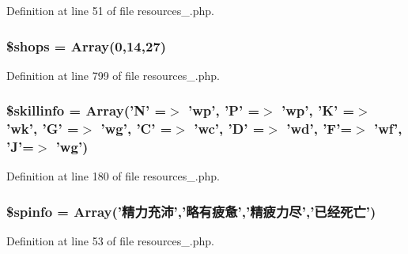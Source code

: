 Definition at line 51 of file resources\+\_.\+php.

\hypertarget{cache_2resources__1_8php_a6a4f6f4fa7edf238e168beb18f0870af}{
\subsubsection[{\$shops}]{\setlength{\rightskip}{0pt plus 5cm}\$shops = Array(0,14,27)}}\label{cache_2resources__1_8php_a6a4f6f4fa7edf238e168beb18f0870af}


Definition at line 799 of file resources\+\_.\+php.

\hypertarget{cache_2resources__1_8php_a94b9a3413b45767e103c4f7ad2346921}{
\subsubsection[{\$skillinfo}]{\setlength{\rightskip}{0pt plus 5cm}\$skillinfo = Array('N' =$>$ 'wp', 'P' =$>$ 'wp', 'K' =$>$ 'wk', 'G' =$>$ 'wg', 'C' =$>$ 'wc', 'D' =$>$ 'wd', 'F'=$>$ 'wf', 'J'=$>$ 'wg')}}\label{cache_2resources__1_8php_a94b9a3413b45767e103c4f7ad2346921}


Definition at line 180 of file resources\+\_.\+php.

\hypertarget{cache_2resources__1_8php_a79b3890cc1a3fac35858fb155b285743}{
\subsubsection[{\$spinfo}]{\setlength{\rightskip}{0pt plus 5cm}\$spinfo = Array('精力充沛','略有疲惫','精疲力尽','已经死亡')}}\label{cache_2resources__1_8php_a79b3890cc1a3fac35858fb155b285743}


Definition at line 53 of file resources\+\_.\+php.

